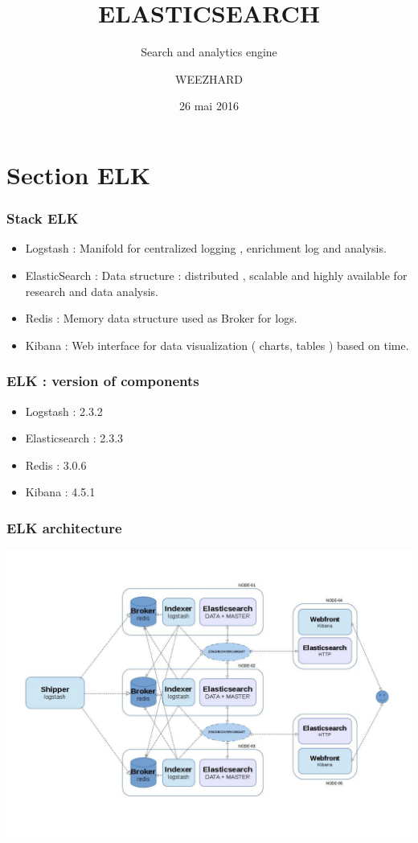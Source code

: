 \documentclass{beamer}
\title{ELASTICSEARCH}
\subtitle{Search and analytics engine}
\date{26 mai 2016}
\author[]{WEEZHARD}
\begin{document}
\begin{frame}
\titlepage
\end{frame}
\begin{frame}
\tableofcontents
\end{frame}
\section{Section ELK}
\begin{frame}
\frametitle{Stack ELK}
\begin{itemize}
\item  Logstash : Manifold for centralized logging , enrichment log and analysis.
\item  ElasticSearch : Data structure : distributed , scalable and highly available for research and data analysis.
\item  Redis : Memory data structure used as Broker for logs.
\item  Kibana : Web interface for data visualization ( charts, tables ) based on time.
\end{itemize}
\end{frame}
%
\begin{frame}
\frametitle{ELK : version of components}
\begin{itemize}
\item  Logstash : 2.3.2
\item  Elasticsearch : 2.3.3
\item  Redis : 3.0.6
\item  Kibana : 4.5.1
\end{itemize}
\end{frame}
%
\begin{frame}
\frametitle{ELK architecture}
\centering
\includegraphics[scale=0.30]{img/elk_arch.jpg}
\end{frame}
\end{document}
